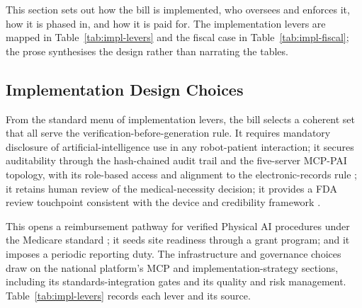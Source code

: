 
This section sets out how the bill is implemented, who oversees and enforces it,
how it is phased in, and how it is paid for. The implementation levers are
mapped in Table~\ref{tab:impl-levers} and the fiscal case in
Table~\ref{tab:impl-fiscal}; the prose synthesises the design rather than
narrating the tables.

\subsection{Implementation Design Choices}

From the standard menu of implementation levers, the bill selects a coherent set
that all serve the verification-before-generation rule. It requires mandatory
disclosure of artificial-intelligence use in any robot-patient interaction; it
secures auditability through the hash-chained audit trail and the five-server
MCP-PAI topology, with its role-based access and alignment to the
electronic-records rule \cite{kawchak2026mcp, cfr-part11}; it retains human review
of the medical-necessity decision; it provides a FDA
review touchpoint consistent with the device and credibility framework
\cite{fda2023credibility}.

This opens a reimbursement pathway for verified Physical
AI procedures under the Medicare standard \cite{usc-1395y}; it seeds site
readiness through a grant program; and it imposes a periodic reporting duty. The
infrastructure and governance choices draw on the national platform's MCP and
implementation-strategy sections, including its standards-integration gates and
its quality and risk management. Table~\ref{tab:impl-levers} records each lever
and its source.

